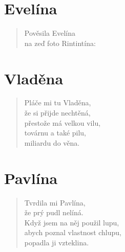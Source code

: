 \section*{Evelína}
\begin{verse}
Pověsila Evelína\\
na zeď foto Rintintína:\\
\end{verse}

\section*{Vladěna}
\begin{verse}
Pláče mi tu Vladěna,\\
že si přijde nechtěná,\\
přestože má velkou vilu,\\
továrnu a také pilu,\\
miliardu do věna.
\end{verse}

\section*{Pavlína}
\begin{verse}
Tvrdila mi Pavlína,\\
že prý pudl nelíná.\\
Když jsem na něj použil lupu,\\
abych poznal vlastnost chlupu,\\
popadla ji vzteklina.
\end{verse}

